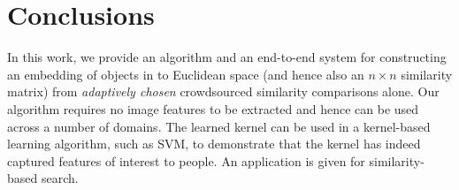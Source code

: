 \documentclass{article}
\begin{document}
\section{Conclusions}
In this work, we provide an algorithm and an end-to-end system for constructing an embedding of
objects in to Euclidean space (and hence also an $n \times n$ similarity matrix) from {\em adaptively chosen} crowdsourced
similarity comparisons alone.  Our algorithm requires no image features to be extracted and hence can be used across a number of domains.
The learned kernel can be used in a kernel-based learning algorithm, such as SVM, to demonstrate that the kernel has indeed captured features of interest to people.  An application is given for similarity-based search.  



\end{document}
